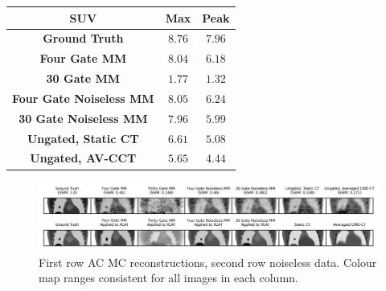 \documentclass[portrait, color=UCLburgundy, margin=1cm]{uclposter}
\begin{document}
\begin{multicols}{2}
\begin{table}[H]
            \resizebox*{1.0\linewidth}{!}
            {
                \begin{tabular}{||c|cc||}
                    \hline
                    \textbf{\acrshort{SUV}}                 & \textbf{Max}  & \textbf{Peak} \\
                    \hline
                    \textbf{Ground Truth}                   & $8.76$        & $7.96$ \\
                    \hline
                    \textbf{Four Gate \gls{MM}}             & $8.04$        & $6.18$ \\
                    \textbf{30 Gate \gls{MM}}               & $1.77$        & $1.32$ \\
                    \hline
                    \textbf{Four Gate Noiseless \gls{MM}}   & $8.05$        & $6.24$ \\
                    \textbf{30 Gate Noiseless \gls{MM}}     & $7.96$        & $5.99$ \\
                    \hline
                    \textbf{Ungated, Static \acrshort{CT}}  & $6.61$        & $5.08$ \\
                    \textbf{Ungated, \gls{AV-CCT}}          & $5.65$        & $4.44$ \\
                    \hline
                \end{tabular}
            }
            \label{tab:suv}
        \end{table}
    \end{multicols}
    
    \begin{figure}[H]
        \centering
        
        \includegraphics[width=1.0\linewidth]{visual_analysis.png}
        
        \begin{highlightbox}[UCLlightblue]
            \captionsetup{singlelinecheck=false, justification=centering}
            \caption{First row \gls{AC} \gls{MC} reconstructions, second row noiseless data. Colour map ranges consistent for all images in each column.}
        \end{highlightbox}
        
        \label{fig:visual_analysis}
    \end{figure}
\end{document}
